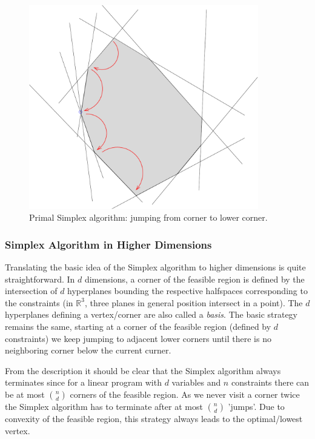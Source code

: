 \documentclass{article}
\begin{document}
\begin{figure}
\includegraphics[width=10cm]{Figs/simplexPrimal.pdf}
\caption{Primal Simplex algorithm: jumping from corner to lower corner.}\label{fig:simplexPrimal}
\end{figure}




\subsubsection{Simplex Algorithm in Higher Dimensions}
Translating the basic idea of the Simplex algorithm to higher dimensions is quite straightforward. In $d$ dimensions, a corner of the feasible region is defined by the intersection of $d$ hyperplanes bounding the respective halfspaces corresponding to the constraints (in $\mathbb{R}^3$, three planes in general position intersect in a point). The $d$ hyperplanes defining a vertex/corner are also called a \emph{basis}. The basic strategy remains the same, starting at a corner of the feasible region (defined by $d$ constraints) we keep jumping to adjacent lower corners until there is no neighboring corner below the current curner.

From the description it should be clear that the Simplex algorithm always terminates since for a linear program with $d$ variables and $n$ constraints there can be at most $n\choose d$ corners of the feasible region. As we never visit a corner twice the Simplex algorithm has to terminate after at most $n \choose d$ 'jumps'. Due to convexity of the feasible region, this strategy always leads to the optimal/lowest vertex.
\end{document}
